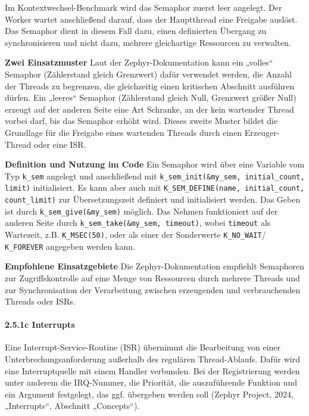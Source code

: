 Im Kontextwechsel-Benchmark wird das Semaphor zuerst leer angelegt. Der Worker wartet anschließend darauf, dass der Hauptthread eine Freigabe auslöst. Das Semaphor dient in diesem Fall dazu, einen definierten Übergang zu synchronisieren und nicht dazu, mehrere gleichartige Ressourcen zu verwalten.

\textbf{Zwei Einsatzmuster} Laut der Zephyr-Dokumentation kann ein „volles“ Semaphor (Zählerstand gleich Grenzwert) dafür verwendet werden, die Anzahl der Threads zu begrenzen, die gleichzeitig einen kritischen Abschnitt ausführen dürfen. Ein „leeres“ Semaphor (Zählerstand gleich Null, Grenzwert größer Null) erzeugt auf der anderen Seite eine Art Schranke, an der kein wartender Thread vorbei darf, bis das Semaphor erhöht wird. Dieses zweite Muster bildet die Grundlage für die Freigabe eines wartenden Threads durch einen Erzeuger-Thread oder eine ISR.

\textbf{Definition und Nutzung im Code }Ein Semaphor wird über eine Variable vom Typ \lstinline[style=fileinline]|k_sem| angelegt und anschließend mit \lstinline[style=fileinline]|k_sem_init(&my_sem, initial_count, limit)| initialisiert. Es kann aber auch mit \lstinline[style=fileinline]|K_SEM_DEFINE(name, initial_count, count_limit)| zur Übersetzungszeit definiert und initialisiert werden. Das Geben ist durch \lstinline[style=fileinline]|k_sem_give(&my_sem)| möglich. Das Nehmen funktioniert auf der anderen Seite durch \lstinline[style=fileinline]|k_sem_take(&my_sem, timeout)|, wobei \lstinline[style=fileinline]|timeout| als Wartezeit, z.B. \lstinline[style=fileinline]|K_MSEC(50)|, oder als einer der Sonderwerte \lstinline[style=fileinline]|K_NO_WAIT|/ \lstinline[style=fileinline]|K_FOREVER| angegeben werden kann.

\textbf{Empfohlene Einsatzgebiete }Die Zephyr-Dokumentation empfiehlt Semaphoren zur Zugriffskontrolle auf eine Menge von Ressourcen durch mehrere Threads und zur Synchronisation der Verarbeitung zwischen erzeugenden und verbrauchenden Threads oder ISRs.

\paragraph*{\textbf{2.5.1c Interrupts}}
Eine Interrupt-Service-Routine (ISR) übernimmt die Bearbeitung von einer Unterbrechungsanforderung außerhalb des regulären Thread-Ablaufs. Dafür wird eine Interruptquelle mit einem Handler verbunden. Bei der Registrierung werden unter anderem die IRQ-Nummer, die Priorität, die auszuführende Funktion und ein Argument festgelegt, das ggf. übergeben werden soll (Zephyr Project, 2024, „Interrupts“, Abschnitt „Concepts“).

